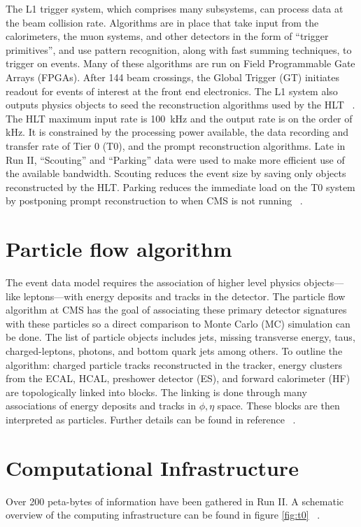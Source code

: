 The L1 trigger system, which comprises many subsystems, can process data at the beam collision rate. Algorithms are in place that take input from the calorimeters, the muon systems, and other detectors in the form of ``trigger primitives'', and use pattern recognition, along with fast summing techniques, to trigger on events. Many of these algorithms are run on Field Programmable Gate Arrays (FPGAs). 
After 144 beam crossings, the Global Trigger (GT) initiates readout for events of interest at the front end electronics. 
 The L1 system also outputs physics objects to seed the reconstruction algorithms used by the HLT ~\cite{Foudas:2232067}. 
The HLT maximum input rate is 100~kHz and the output rate is on the order of kHz. It is constrained by the processing power available, the data recording and transfer rate of Tier 0 (T0), and the prompt reconstruction algorithms. Late in Run II,  ``Scouting'' and ``Parking'' data were used to make more efficient use of the available bandwidth. Scouting reduces the event size by saving only objects reconstructed by the HLT. Parking reduces the immediate load on the T0 system by postponing prompt reconstruction to when CMS is not running ~\cite{Thomas:2703017}.


\section{Particle flow algorithm}
The event data model requires the association of higher level physics objects---like leptons---with energy deposits and tracks in the detector. 
The particle flow algorithm at CMS has the goal of associating these primary detector signatures with these particles so a direct comparison to Monte Carlo (MC) simulation can be done. 
The list of particle objects includes jets, missing transverse energy, taus, charged-leptons, photons, and bottom quark jets among others.
To outline the algorithm: charged particle tracks reconstructed in the tracker, energy clusters from the ECAL, HCAL, preshower detector (ES), and forward calorimeter (HF) are topologically linked into blocks. The linking is done through many associations of energy deposits and tracks in $\phi,\eta$ space. These blocks are then interpreted as particles. Further details can be found in reference ~\cite{CMS-PAS-PFT-10-001}.

\section{Computational Infrastructure}
Over 200 peta-bytes of information have been gathered in Run II. A schematic overview of the computing infrastructure can be found in figure \ref{fig:t0} ~\cite{Hufnagel:1319049}.

